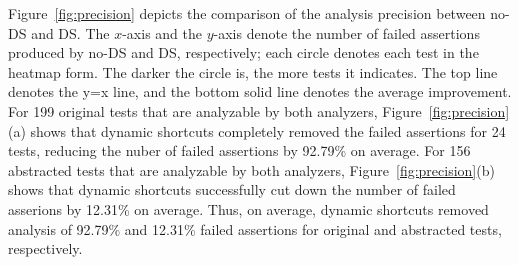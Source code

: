 Figure~\ref{fig:precision} depicts the comparison of the analysis
precision between no-DS and DS.  The $x$-axis and the $y$-axis denote
the number of failed assertions produced by no-DS and DS, respectively;
each circle denotes each test in the heatmap form. The darker the circle is, the more tests it indicates.
The top line
denotes the y=x line, and the bottom solid line denotes the average improvement.
For 199 original tests that are analyzable by both analyzers,
Figure~\ref{fig:precision}(a) shows that dynamic shortcuts
completely removed the failed assertions for 24 tests, reducing the nuber of failed assertions by 92.79\% on average.
For 156 abstracted tests that are analyzable by both analyzers,
Figure~\ref{fig:precision}(b) shows that dynamic shortcuts successfully cut down
the number of failed asserions by 12.31\% on average.
Thus, on average, dynamic shortcuts removed analysis of 92.79\% and 12.31\% failed assertions
for original and abstracted tests, respectively.
